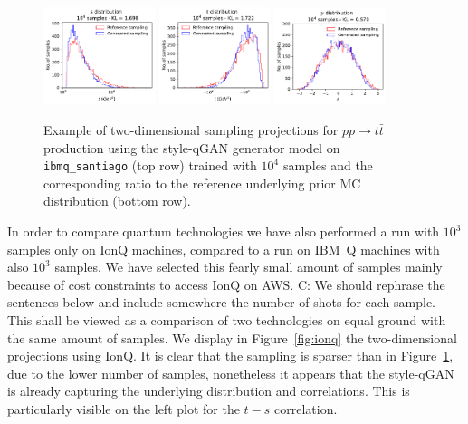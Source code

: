 \documentclass[twocolumn,preprintnumbers,superscriptaddress]{revtex4-2}
\begin{document}
\begin{figure}
  \includegraphics[width=0.29\textwidth]{plots/hardware/ibm_santiago/s-distribution_LHCdata_10k.pdf}%
  \includegraphics[width=0.29\textwidth]{plots/hardware/ibm_santiago/t-distribution_LHCdata_10k.pdf}%
  \includegraphics[width=0.29\textwidth]{plots/hardware/ibm_santiago/y-distribution_LHCdata_10k.pdf}

  \caption{\label{fig:ibm}Example of two-dimensional sampling projections for
  $pp \rightarrow t\bar{t}$ production using the style-qGAN generator
  model on {\tt ibmq\_santiago} (top row) trained with $10^4$ samples and
  the corresponding ratio to the reference underlying prior MC
  distribution (bottom row).}
\end{figure}


In order to compare quantum technologies we have also performed a run
with $10^3$ samples only on IonQ machines, compared to a run on IBM~Q
machines with also $10^3$ samples. We have selected this fearly small
amount of samples mainly because of cost constraints to access IonQ on
AWS. {\color{red} C: We should rephrase the sentences below and include somewhere the number of shots for each sample. --- This shall be viewed as a comparison of two technologies on equal
ground with the same amount of samples. We display in
Figure~\ref{fig:ionq} the two-dimensional projections using IonQ. It
is clear that the sampling is sparser than in Figure~\ref{fig:ibm},
due to the lower number of samples, nonetheless it appears that the
style-qGAN is already capturing the underlying distribution and
correlations. This is particularly visible on the left plot for the
$t-s$ correlation.}
\end{document}
